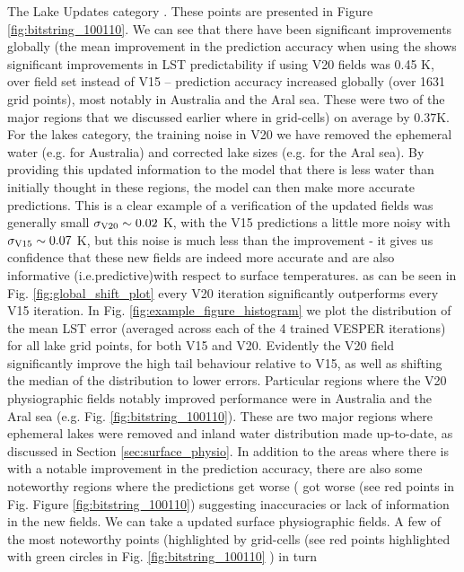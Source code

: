 \documentclass[hess, twostagejnl]{copernicus}
\providecommand{\DIFadd}[1]{{\protect\color{blue} \sf #1}} %
\providecommand{\DIFdel}[1]{{\protect\color{red} \scriptsize #1}} %
\providecommand{\DIFaddbegin}{} %
\providecommand{\DIFaddend}{} %
\providecommand{\DIFdelbegin}{} %
\providecommand{\DIFdelend}{} %
\begin{document}
\DIFadd{The }\DIFaddend Lake Updates category \DIFdelbegin \DIFdel{. These points are presented in Figure \ref{fig:bitstring_100110}.  We can see that there have been significant improvements globally (the mean improvement in the prediction accuracy when using the }\DIFdelend \DIFaddbegin \DIFadd{shows significant improvements in LST predictability if using }\DIFaddend V20 \DIFdelbegin \DIFdel{fields was 0.45 K, over }\DIFdelend \DIFaddbegin \DIFadd{field set instead of V15 – prediction accuracy increased globally (over }\DIFaddend 1631 \DIFdelbegin \DIFdel{grid points), most notably in Australia and the Aral sea. These were two of the major regions that we discussed earlier where in }\DIFdelend \DIFaddbegin \DIFadd{grid-cells) on average by 0.37K. For the lakes category, the training noise in }\DIFaddend V20 \DIFdelbegin \DIFdel{we have removed the ephemeral water (e.g. for Australia) and corrected lake sizes (e.g. for the Aral sea). By providing this updated information to the model that there is less water than initially thought in these regions, the model can then make more accurate predictions. This is a clear example of a verification of the updated fields }\DIFdelend \DIFaddbegin \DIFadd{was generally small $\sigma_{\rm V20} \sim 0.02$ K, with the V15 predictions a little more noisy with $\sigma_{\rm V15} \sim 0.07$ K, but this noise is much less than the improvement }\DIFaddend - \DIFdelbegin \DIFdel{it gives us confidence that these new fields are indeed more accurate and are also informative (i.e.predictive)with respect to surface temperatures. }\DIFdelend \DIFaddbegin \DIFadd{as can be seen in Fig. \ref{fig:global_shift_plot} every V20 iteration significantly outperforms every V15 iteration. In Fig. \ref{fig:example_figure_histogram} we plot the distribution of the mean LST error (averaged across each of the 4 trained VESPER iterations) for all lake grid points, for both V15 and V20. Evidently the V20 field significantly improve the high tail behaviour relative to V15, as well as shifting the median of the distribution to lower errors. Particular regions where the V20 physiographic fields notably improved performance were in Australia and the Aral sea (e.g. Fig. \ref{fig:bitstring_100110}). These are two major regions where ephemeral lakes were removed and inland water distribution made up-to-date, as discussed in Section \ref{sec:surface_physio}. }\DIFaddend In addition to the areas \DIFdelbegin \DIFdel{where there is }\DIFdelend \DIFaddbegin \DIFadd{with }\DIFaddend a notable improvement in the prediction accuracy, there are \DIFdelbegin \DIFdel{also }\DIFdelend some noteworthy regions where the predictions \DIFdelbegin \DIFdel{get worse (}\DIFdelend \DIFaddbegin \DIFadd{got worse (see }\DIFaddend red points in \DIFdelbegin \DIFdel{Fig. }\DIFdelend \DIFaddbegin \DIFadd{Figure }\DIFaddend \ref{fig:bitstring_100110}) suggesting inaccuracies or lack of information in the \DIFdelbegin \DIFdel{new fields. We can take a }\DIFdelend \DIFaddbegin \DIFadd{updated surface physiographic fields. A }\DIFaddend few of the most noteworthy \DIFdelbegin \DIFdel{points (highlighted by }\DIFdelend \DIFaddbegin \DIFadd{grid-cells (see red points highlighted with }\DIFaddend green circles in \DIFdelbegin \DIFdel{Fig. \ref{fig:bitstring_100110} ) in turn}\DIFdelend \DIFaddbegin 
\end{document}
